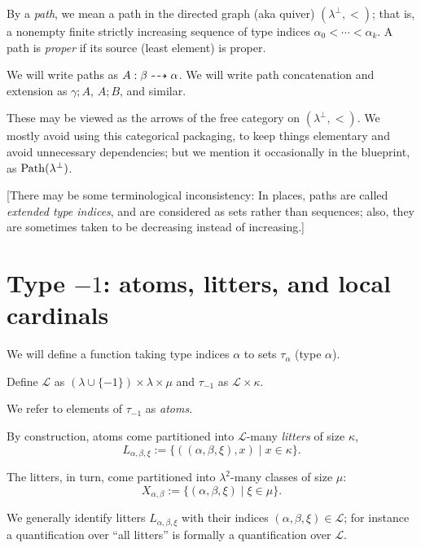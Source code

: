 \begin{definition}
\label{def:path}
\leanok
{}
By a \emph{path}, we mean a path in the directed graph (aka quiver) $(\lambda^\bot,<)$; that is, a nonempty finite strictly increasing sequence of type indices $\alpha_0 < \cdots < \alpha_k$.  A path is \emph{proper} if its source (least element) is proper.

We will write paths as $A : \beta \dashrightarrow \alpha$.  We will write path concatenation and extension as $\gamma;A$, $A;B$, and similar.

These may be viewed as the arrows of the free category on $(\lambda^\bot,<)$.  We mostly avoid using this categorical packaging, to keep things elementary and avoid unnecessary dependencies; but we mention it occasionally in the blueprint, as $\mathrm{Path}(\lambda^\bot)$.

[There may be some terminological inconsistency: In places, paths are called \emph{extended type indices}, and are considered as sets rather than sequences; also, they are sometimes taken to be decreasing instead of increasing.]
\end{definition}

\section{Type $-1$: atoms, litters, and local cardinals}

We will define a function taking type indices $\alpha$ to sets $\tau_\alpha$ (type $\alpha$).

\newcommand{\Litter}{\mathcal{L}}
\newcommand{\NearLitter}{\mathcal{NL}}
\begin{definition}
\label{def:atoms-and-litters}
\leanok
{}
Define $\Litter$ as $ (\lambda \cup \{-1\}) \times \lambda \times \mu$ and $\tau_{-1}$ as $\Litter \times \kappa$.

We refer to elements of $\tau_{-1}$ as \emph{atoms}.

By construction, atoms come partitioned into $\Litter$-many \emph{litters} of size $\kappa$,
\[ L_{\alpha,\beta,\xi} := \{((\alpha,\beta,\xi),x) \mid x \in \kappa \}.\]

The litters, in turn, come partitioned into $\lambda^2$-many classes of size $\mu$:
\[ X_{\alpha,\beta} := \{ (\alpha,\beta,\xi) \mid \xi \in \mu \}. \]

We generally identify litters $L_{\alpha,\beta,\xi}$ with their indices $(\alpha,\beta,\xi) \in \Litter$; for instance a quantification over “all litters” is formally a quantification over $\Litter$.
\end{definition}

